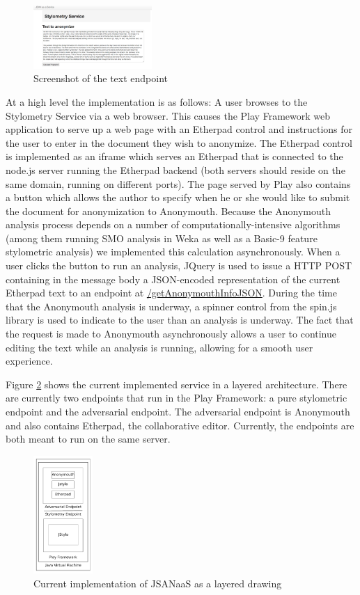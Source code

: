 \documentclass[letterpaper]{article}
\begin{document}
\begin{figure}
  \centering
    \includegraphics[width=0.4\textwidth]{img/text_endpoint.png}
  \caption{Screenshot of the text endpoint}
  \label{fig:text_endpoint}
\end{figure}

At a high level the implementation is as follows: A user browses to
the Stylometry Service via a web browser. This causes the Play
Framework web application to serve up a web page with an Etherpad
control and instructions for the user to enter in the document they
wish to anonymize. The Etherpad control is implemented as an iframe
which serves an Etherpad that is connected to the node.js server
running the Etherpad backend (both servers should reside on the same
domain, running on different ports). The page served by Play also
contains a button which allows the author to specify when he or she
would like to submit the document for anonymization to
Anonymouth. Because the Anonymouth analysis process depends on a
number of computationally-intensive algorithms (among them running SMO
analysis in Weka as well as a Basic-9 feature stylometric analysis) we
implemented this calculation asynchronously. When a user clicks the
button to run an analysis, JQuery is used to issue a HTTP POST
containing in the message body a JSON-encoded representation of the
current Etherpad text to an endpoint at
\url{/getAnonymouthInfoJSON}. During the time that the Anonymouth
analysis is underway, a spinner control from the spin.js library is
used to indicate to the user than an analysis is underway. The fact
that the request is made to Anonymouth asynchronously allows a user to
continue editing the text while an analysis is running, allowing for a
smooth user experience.

Figure \ref{fig:impl} shows the current implemented service in a
layered architecture.  There are currently two endpoints that run in
the Play Framework: a pure stylometric endpoint and the adversarial
endpoint.  The adversarial endpoint is Anonymouth and also contains
Etherpad, the collaborative editor.  Currently, the endpoints are both
meant to run on the same server.

\begin{figure}
  \centering
    \includegraphics[width=0.2\textwidth]{img/impl.pdf}
  \caption{Current implementation of JSANaaS as a layered drawing}
  \label{fig:impl}
\end{figure}
\end{document}
